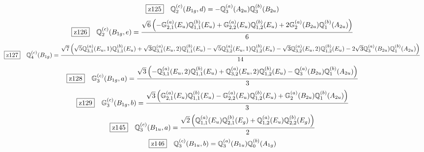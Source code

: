 \documentclass[fleqn,10pt,landscape]{jsarticle}
\begin{document}
\begin{dmath*}
\hspace*{3mm}\fbox{z125}\quad \mathbb{Q}_{2}^{(c)}(B_{1g},d)=- \mathbb{Q}_{3}^{(a)}(A_{2u}) \mathbb{Q}_{3}^{(b)}(B_{2u})
\end{dmath*}
\begin{dmath*}
\hspace*{3mm}\fbox{z126}\quad \mathbb{Q}_{2}^{(c)}(B_{1g},e)=\frac{\sqrt{6} \left(- \mathbb{G}_{2,1}^{(a)}(E_{u}) \mathbb{Q}_{1,1}^{(b)}(E_{u}) + \mathbb{G}_{2,2}^{(a)}(E_{u}) \mathbb{Q}_{1,2}^{(b)}(E_{u}) + 2 \mathbb{G}_{2}^{(a)}(B_{2u}) \mathbb{Q}_{1}^{(b)}(A_{2u})\right)}{6}
\end{dmath*}
\begin{dmath*}
\hspace*{3mm}\fbox{z127}\quad \mathbb{Q}_{4}^{(c)}(B_{1g})=\frac{\sqrt{7} \left(\sqrt{5} \mathbb{Q}_{3,1}^{(a)}(E_{u},1) \mathbb{Q}_{1,1}^{(b)}(E_{u}) + \sqrt{3} \mathbb{Q}_{3,1}^{(a)}(E_{u},2) \mathbb{Q}_{1,1}^{(b)}(E_{u}) - \sqrt{5} \mathbb{Q}_{3,2}^{(a)}(E_{u},1) \mathbb{Q}_{1,2}^{(b)}(E_{u}) - \sqrt{3} \mathbb{Q}_{3,2}^{(a)}(E_{u},2) \mathbb{Q}_{1,2}^{(b)}(E_{u}) - 2 \sqrt{3} \mathbb{Q}_{3}^{(a)}(B_{2u}) \mathbb{Q}_{1}^{(b)}(A_{2u})\right)}{14}
\end{dmath*}
\begin{dmath*}
\hspace*{3mm}\fbox{z128}\quad \mathbb{G}_{3}^{(c)}(B_{1g},a)=\frac{\sqrt{3} \left(- \mathbb{Q}_{3,1}^{(a)}(E_{u},2) \mathbb{Q}_{1,1}^{(b)}(E_{u}) + \mathbb{Q}_{3,2}^{(a)}(E_{u},2) \mathbb{Q}_{1,2}^{(b)}(E_{u}) - \mathbb{Q}_{3}^{(a)}(B_{2u}) \mathbb{Q}_{1}^{(b)}(A_{2u})\right)}{3}
\end{dmath*}
\begin{dmath*}
\hspace*{3mm}\fbox{z129}\quad \mathbb{G}_{3}^{(c)}(B_{1g},b)=\frac{\sqrt{3} \left(\mathbb{G}_{2,1}^{(a)}(E_{u}) \mathbb{Q}_{1,1}^{(b)}(E_{u}) - \mathbb{G}_{2,2}^{(a)}(E_{u}) \mathbb{Q}_{1,2}^{(b)}(E_{u}) + \mathbb{G}_{2}^{(a)}(B_{2u}) \mathbb{Q}_{1}^{(b)}(A_{2u})\right)}{3}
\end{dmath*}
\begin{dmath*}
\hspace*{3mm}\fbox{z145}\quad \mathbb{Q}_{3}^{(c)}(B_{1u},a)=\frac{\sqrt{2} \left(\mathbb{Q}_{1,1}^{(a)}(E_{u}) \mathbb{Q}_{2,1}^{(b)}(E_{g}) + \mathbb{Q}_{1,2}^{(a)}(E_{u}) \mathbb{Q}_{2,2}^{(b)}(E_{g})\right)}{2}
\end{dmath*}
\begin{dmath*}
\hspace*{3mm}\fbox{z146}\quad \mathbb{Q}_{3}^{(c)}(B_{1u},b)=\mathbb{Q}_{3}^{(a)}(B_{1u}) \mathbb{Q}_{0}^{(b)}(A_{1g})
\end{dmath*}
\end{document}
